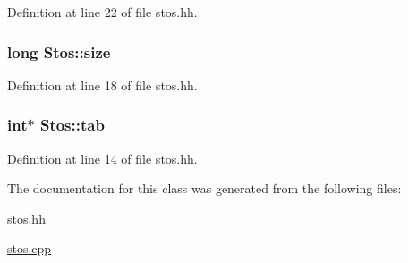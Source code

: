 Definition at line 22 of file stos.\-hh.

\hypertarget{class_stos_a07ba18a24f8f0dbd9144406d15bcd342}{
\subsubsection[{size}]{\setlength{\rightskip}{0pt plus 5cm}long Stos\-::size\hspace{0.3cm}{\ttfamily [private]}}}\label{class_stos_a07ba18a24f8f0dbd9144406d15bcd342}


Definition at line 18 of file stos.\-hh.

\hypertarget{class_stos_abcb666dd5a69fe50228595dc8ac4160a}{
\subsubsection[{tab}]{\setlength{\rightskip}{0pt plus 5cm}int$\ast$ Stos\-::tab\hspace{0.3cm}{\ttfamily [private]}}}\label{class_stos_abcb666dd5a69fe50228595dc8ac4160a}


Definition at line 14 of file stos.\-hh.



The documentation for this class was generated from the following files\-:\begin{DoxyCompactItemize}
\item 
\hyperlink{stos_8hh}{stos.\-hh}\item 
\hyperlink{stos_8cpp}{stos.\-cpp}\end{DoxyCompactItemize}
